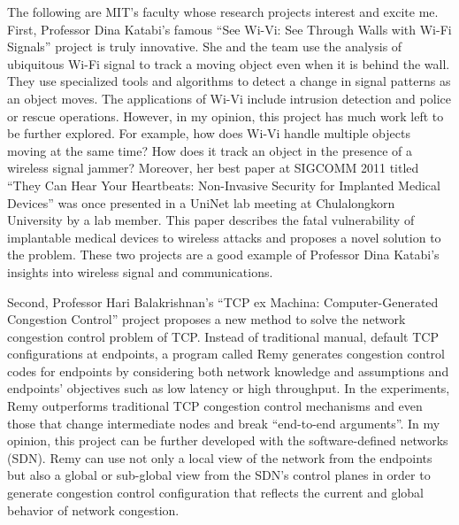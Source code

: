 \documentclass[a4paper,10pt]{report}
\newcommand{\uniabbre}{MIT}
\begin{document}
\vspace{0.2cm}
The following are \uniabbre's faculty whose research projects interest and excite me. First, Professor Dina Katabi's famous ``See Wi-Vi: See Through Walls with Wi-Fi Signals'' project is truly innovative. She and the team use the analysis of ubiquitous Wi-Fi signal to track a moving object even when it is behind the wall. They use specialized tools and algorithms to detect a change in signal patterns as an object moves. The applications of Wi-Vi include intrusion detection and police or rescue operations. However, in my opinion, this project has much work left to be further explored. For example, how does Wi-Vi handle multiple objects moving at the same time? How does it track an object in the presence of a wireless signal jammer? Moreover, her best paper at SIGCOMM 2011 titled ``They Can Hear Your Heartbeats: Non-Invasive Security for Implanted Medical Devices'' was once presented in a UniNet lab meeting at Chulalongkorn University by a lab member. This paper describes the fatal vulnerability of implantable medical devices to wireless attacks and proposes a novel solution to the problem. These two projects are a good example of Professor Dina Katabi's insights into wireless signal and communications. 

\vspace{0.2cm}
Second, Professor Hari Balakrishnan's ``TCP ex Machina: Computer-Generated Congestion Control'' project proposes a new method to solve the network congestion control problem of TCP. Instead of traditional manual, default TCP configurations at endpoints, a program called Remy generates congestion control codes for endpoints by considering both network knowledge and assumptions and endpoints' objectives such as low latency or high throughput. In the experiments, Remy outperforms traditional TCP congestion control mechanisms and even those that change intermediate nodes and break ``end-to-end arguments''. In my opinion, this project can be further developed with the software-defined networks (SDN). Remy can use not only a local view of the network from the endpoints but also a global or sub-global view from the SDN's control planes in order to generate congestion control configuration that reflects the current and global behavior of network congestion. 
\end{document}
